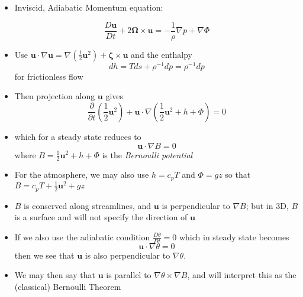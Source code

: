\documentclass[30pt,landscape]{foils}
\newcommand{\pdiff}[2]{\frac{\partial #1}{\partial #2}}
\begin{document}
\hypersetup{pdfpagetransition=Replace}

\begin{itemize}

  \item Inviscid, Adiabatic Momentum equation:

  \begin{equation*}
    \frac{D \bm{u}}{D t} + 2\bm{\Omega} \times \bm{u} = -\frac{1}{\rho} \nabla p + \nabla \Phi
  \end{equation*}

  \item Use $\bm{u} \cdot \nabla \bm{u} = \nabla \left(\frac{1}{2} \bm{u}^2 \right) + \bm{\zeta} \times \bm{u}$ and the enthalpy
  \begin{equation*}
    dh = T ds + \rho^{-1} dp = \rho^{-1} dp
  \end{equation*}
  for frictionless flow

  \item Then projection along $\bm{u}$ gives
  \begin{equation*}
    \pdiff{}{t} \left(\frac{1}{2}\bm{u}^2 \right) + \bm{u} \cdot \nabla \left( \frac{1}{2} \bm{u}^2 + h + \Phi \right) = 0
  \end{equation*}
  \item which for a steady state reduces to
  \begin{equation*}
    \bm{u} \cdot \nabla B = 0
  \end{equation*}
  where $B = \frac{1}{2} \bm{u}^2 + h + \Phi$ is the \emph{Bernoulli potential}

  \item For the atmosphere, we may also use $h = c_p T$ and $\Phi = gz$ so that $B = c_p T + \frac{1}{2} \bm{u}^2 + g z$

  \item $B$ is conserved along streamlines, and $\bm{u}$ is perpendicular to $\nabla B$; but in 3D, $B$ is a surface and will not specify the direction of $\bm{u}$

  \item If we also use the adiabatic condition $\frac{D \theta}{D t} = 0$ which in steady state becomes
  \begin{equation*}
    \bm{u} \cdot \nabla \theta = 0
  \end{equation*}
      then we see that $\bm{u}$ is also perpendicular to $\nabla \theta$.

  \item We may then say that $\bm{u}$ is parallel to $\nabla \theta \times \nabla B$, and will interpret this as the (classical) Bernoulli Theorem

\end{itemize}
\end{document}
